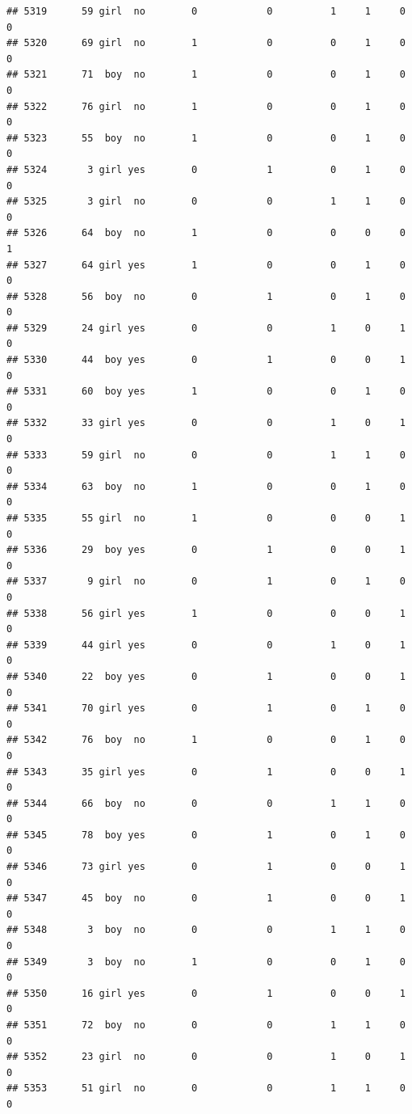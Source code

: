 \documentclass[man]{apa6}
\begin{document}
\begin{verbatim}
## 5319      59 girl  no        0            0          1     1     0     0
## 5320      69 girl  no        1            0          0     1     0     0
## 5321      71  boy  no        1            0          0     1     0     0
## 5322      76 girl  no        1            0          0     1     0     0
## 5323      55  boy  no        1            0          0     1     0     0
## 5324       3 girl yes        0            1          0     1     0     0
## 5325       3 girl  no        0            0          1     1     0     0
## 5326      64  boy  no        1            0          0     0     0     1
## 5327      64 girl yes        1            0          0     1     0     0
## 5328      56  boy  no        0            1          0     1     0     0
## 5329      24 girl yes        0            0          1     0     1     0
## 5330      44  boy yes        0            1          0     0     1     0
## 5331      60  boy yes        1            0          0     1     0     0
## 5332      33 girl yes        0            0          1     0     1     0
## 5333      59 girl  no        0            0          1     1     0     0
## 5334      63  boy  no        1            0          0     1     0     0
## 5335      55 girl  no        1            0          0     0     1     0
## 5336      29  boy yes        0            1          0     0     1     0
## 5337       9 girl  no        0            1          0     1     0     0
## 5338      56 girl yes        1            0          0     0     1     0
## 5339      44 girl yes        0            0          1     0     1     0
## 5340      22  boy yes        0            1          0     0     1     0
## 5341      70 girl yes        0            1          0     1     0     0
## 5342      76  boy  no        1            0          0     1     0     0
## 5343      35 girl yes        0            1          0     0     1     0
## 5344      66  boy  no        0            0          1     1     0     0
## 5345      78  boy yes        0            1          0     1     0     0
## 5346      73 girl yes        0            1          0     0     1     0
## 5347      45  boy  no        0            1          0     0     1     0
## 5348       3  boy  no        0            0          1     1     0     0
## 5349       3  boy  no        1            0          0     1     0     0
## 5350      16 girl yes        0            1          0     0     1     0
## 5351      72  boy  no        0            0          1     1     0     0
## 5352      23 girl  no        0            0          1     0     1     0
## 5353      51 girl  no        0            0          1     1     0     0

\end{verbatim}
\end{document}

